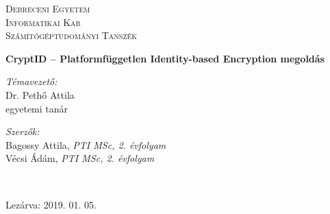 %
%
%

\begin{titlepage}

\center

\textsc{\LARGE Debreceni Egyetem}\\[1.5cm]
\textsc{\Large Informatikai Kar}
\\[0.5cm]

\textsc{\large Számítógéptudományi Tanszék}
\\[2.5cm]

{\huge \bfseries CryptID – Platformfüggetlen Identity-based Encryption megoldás \par}

\if{}
  \vspace*{6.5cm}

  \begin{minipage}{.4\linewidth}
    \begin{flushleft}
      \large \textit{Témavezető:} \\
      Dr. Pethő Attila  \\
      egyetemi tanár
    \end{flushleft}
  \end{minipage}
  \hfill
  \begin{minipage}{.52\linewidth} 
    \begin{flushright}
      \large \textit{Szerzők:}\\
      Bagossy Attila, \textit{PTI MSc, 2. évfolyam} \\
      Vécsi Ádám, \textit{PTI MSc, 2. évfolyam}
    \end{flushright}
  \end{minipage}
  \\[2.5cm]
\else
  \vspace*{10.5cm}
\fi

{\large Lezárva: 2019. 01. 05.}\\ 

\vfill

\end{titlepage}